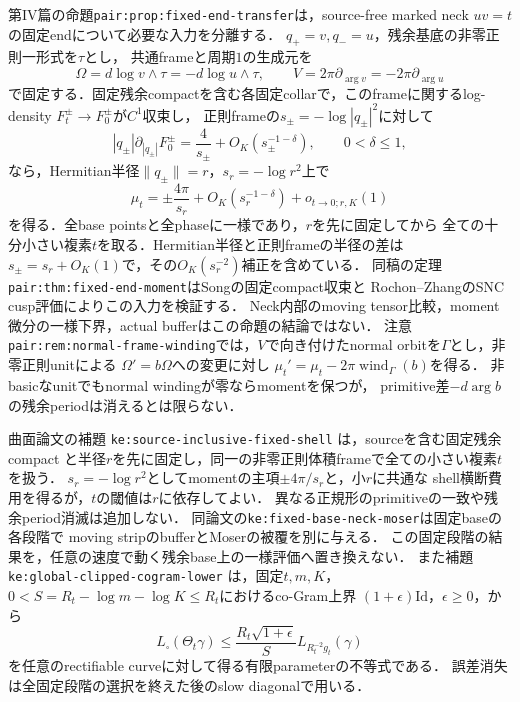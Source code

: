 \documentclass[a4paper,11pt]{ltjsarticle}
\numberwithin{equation}{section}
\theoremstyle{plain}
\theoremstyle{definition}
\theoremstyle{remark}
\newcommand{\Rt}{R_t}
\begin{document}
第IV篇の命題\texttt{pair:prop:fixed-end-transfer}は，source-free marked neck
\(uv=t\)の固定endについて必要な入力を分離する．
\(q_+=v,q_-=u\)，残余基底の非零正則一形式を\(\tau\)とし，
共通frameと周期\(1\)の生成元を
\[
 \Omega=d\log v\wedge\tau=-d\log u\wedge\tau,
 \qquad V=2\pi\partial_{\arg v}=-2\pi\partial_{\arg u}
\]
で固定する．固定残余compactを含む各固定collarで，このframeに関するlog-density
\(F_t^\pm\to F_0^\pm\)が\(C^1\)収束し，
正則frameの\(s_\pm=-\log|q_\pm|^2\)に対して
\[
 |q_\pm|\partial_{|q_\pm|}F_0^\pm
   =\frac4{s_\pm}+O_K(s_\pm^{-1-\delta}),\qquad0<\delta\le1,
\]
なら，Hermitian半径\(\|q_\pm\|=r\)，\(s_r=-\log r^2\)上で
\[
 \mu_t=\pm\frac{4\pi}{s_r}
        +O_K(s_r^{-1-\delta})+o_{t\to0;r,K}(1)
\]
を得る．全base pointsと全phaseに一様であり，\(r\)を先に固定してから
全ての十分小さい複素\(t\)を取る．Hermitian半径と正則frameの半径の差は
\(s_\pm=s_r+O_K(1)\)で，その\(O_K(s_r^{-2})\)補正を含めている．
同稿の定理\texttt{pair:thm:fixed-end-moment}はSongの固定compact収束と
Rochon--ZhangのSNC cusp評価によりこの入力を検証する．
Neck内部のmoving tensor比較，moment微分の一様下界，actual bufferはこの命題の結論ではない．
注意\texttt{pair:rem:normal-frame-winding}では，\(V\)で向き付けたnormal orbitを\(\Gamma\)とし，非零正則unitによる
\(\Omega'=b\Omega\)への変更に対し
\(\mu_t'=\mu_t-2\pi\operatorname{wind}_{\Gamma}(b)\)を得る．
非basicなunitでもnormal windingが零ならmomentを保つが，
primitive差\(-d\arg b\)の残余periodは消えるとは限らない．

曲面論文の補題 \texttt{ke:source-inclusive-fixed-shell} は，sourceを含む固定残余compact
と半径\(r\)を先に固定し，同一の非零正則体積frameで全ての小さい複素\(t\)を扱う．
\(s_r=-\log r^2\)としてmomentの主項\(\pm4\pi/s_r\)と，小\(r\)に共通な
shell横断費用を得るが，\(t\)の閾値は\(r\)に依存してよい．
異なる正規形のprimitiveの一致や残余period消滅は追加しない．
同論文の\texttt{ke:fixed-base-neck-moser}は固定baseの各段階で
moving stripのbufferとMoserの被覆を別に与える．
この固定段階の結果を，任意の速度で動く残余base上の一様評価へ置き換えない．
また補題 \texttt{ke:global-clipped-cogram-lower} は，固定\(t,m,K\)，
\(0<S=\Rt-\log m-\log K\le\Rt\)におけるco-Gram上界
\((1+\epsilon)\mathrm{Id}\)，\(\epsilon\ge0\)，から
\[
 L_\square(\Theta_t\gamma)
 \le\frac{\Rt\sqrt{1+\epsilon}}S L_{\Rt^{-2}g_t}(\gamma)
\]
を任意のrectifiable curveに対して得る有限parameterの不等式である．
誤差消失は全固定段階の選択を終えた後のslow diagonalで用いる．
\end{document}
